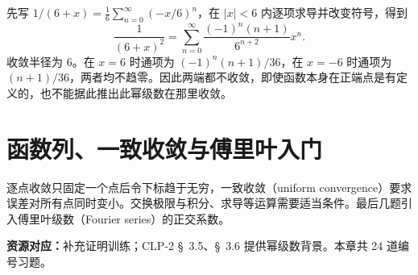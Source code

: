 \documentclass[UTF8,12pt,a4paper,fontset=fandol]{ctexart}
\begin{document}
\begin{solve}\label{ans:c27q24}
先写 $1/(6+x)=\frac{1}{6}\sum_{n=0}^\infty(-x/6)^n$，在 $|x|<6$ 内逐项求导并改变符号，得到
\[
\frac1{(6+x)^2}=\sum_{n=0}^\infty\frac{(-1)^n(n+1)}{6^{n+2}}x^n.
\]
收敛半径为 $6$。在 $x=6$ 时通项为 $(-1)^n(n+1)/36$，在 $x=-6$ 时通项为 $(n+1)/36$，两者均不趋零。因此两端都不收敛，即使函数本身在正端点是有定义的，也不能据此推出此幂级数在那里收敛。
\end{solve}

\clearpage
\section{函数列、一致收敛与傅里叶入门}\label{sec:ch28}
逐点收敛只固定一个点后令下标趋于无穷，一致收敛（uniform convergence）要求误差对所有点同时变小。交换极限与积分、求导等运算需要适当条件。最后几题引入傅里叶级数（Fourier series）的正交系数。

\textbf{资源对应：}补充证明训练；CLP-2 \S~3.5、\S~3.6 提供幂级数背景。本章共 24 道编号习题。
\end{document}
